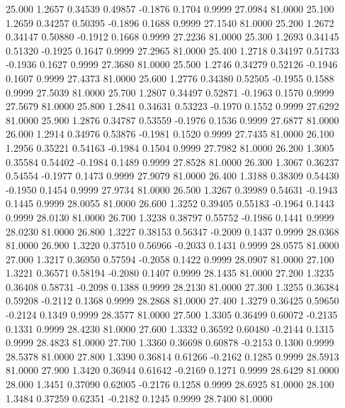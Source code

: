   25.000   1.2657   0.34539   0.49857  -0.1876   0.1704   0.9999  27.0984  81.0000
  25.100   1.2659   0.34257   0.50395  -0.1896   0.1688   0.9999  27.1540  81.0000
  25.200   1.2672   0.34147   0.50880  -0.1912   0.1668   0.9999  27.2236  81.0000
  25.300   1.2693   0.34145   0.51320  -0.1925   0.1647   0.9999  27.2965  81.0000
  25.400   1.2718   0.34197   0.51733  -0.1936   0.1627   0.9999  27.3680  81.0000
  25.500   1.2746   0.34279   0.52126  -0.1946   0.1607   0.9999  27.4373  81.0000
  25.600   1.2776   0.34380   0.52505  -0.1955   0.1588   0.9999  27.5039  81.0000
  25.700   1.2807   0.34497   0.52871  -0.1963   0.1570   0.9999  27.5679  81.0000
  25.800   1.2841   0.34631   0.53223  -0.1970   0.1552   0.9999  27.6292  81.0000
  25.900   1.2876   0.34787   0.53559  -0.1976   0.1536   0.9999  27.6877  81.0000
  26.000   1.2914   0.34976   0.53876  -0.1981   0.1520   0.9999  27.7435  81.0000
  26.100   1.2956   0.35221   0.54163  -0.1984   0.1504   0.9999  27.7982  81.0000
  26.200   1.3005   0.35584   0.54402  -0.1984   0.1489   0.9999  27.8528  81.0000
  26.300   1.3067   0.36237   0.54554  -0.1977   0.1473   0.9999  27.9079  81.0000
  26.400   1.3188   0.38309   0.54430  -0.1950   0.1454   0.9999  27.9734  81.0000
  26.500   1.3267   0.39989   0.54631  -0.1943   0.1445   0.9999  28.0055  81.0000
  26.600   1.3252   0.39405   0.55183  -0.1964   0.1443   0.9999  28.0130  81.0000
  26.700   1.3238   0.38797   0.55752  -0.1986   0.1441   0.9999  28.0230  81.0000
  26.800   1.3227   0.38153   0.56347  -0.2009   0.1437   0.9999  28.0368  81.0000
  26.900   1.3220   0.37510   0.56966  -0.2033   0.1431   0.9999  28.0575  81.0000
  27.000   1.3217   0.36950   0.57594  -0.2058   0.1422   0.9999  28.0907  81.0000
  27.100   1.3221   0.36571   0.58194  -0.2080   0.1407   0.9999  28.1435  81.0000
  27.200   1.3235   0.36408   0.58731  -0.2098   0.1388   0.9999  28.2130  81.0000
  27.300   1.3255   0.36384   0.59208  -0.2112   0.1368   0.9999  28.2868  81.0000
  27.400   1.3279   0.36425   0.59650  -0.2124   0.1349   0.9999  28.3577  81.0000
  27.500   1.3305   0.36499   0.60072  -0.2135   0.1331   0.9999  28.4230  81.0000
  27.600   1.3332   0.36592   0.60480  -0.2144   0.1315   0.9999  28.4823  81.0000
  27.700   1.3360   0.36698   0.60878  -0.2153   0.1300   0.9999  28.5378  81.0000
  27.800   1.3390   0.36814   0.61266  -0.2162   0.1285   0.9999  28.5913  81.0000
  27.900   1.3420   0.36944   0.61642  -0.2169   0.1271   0.9999  28.6429  81.0000
  28.000   1.3451   0.37090   0.62005  -0.2176   0.1258   0.9999  28.6925  81.0000
  28.100   1.3484   0.37259   0.62351  -0.2182   0.1245   0.9999  28.7400  81.0000
